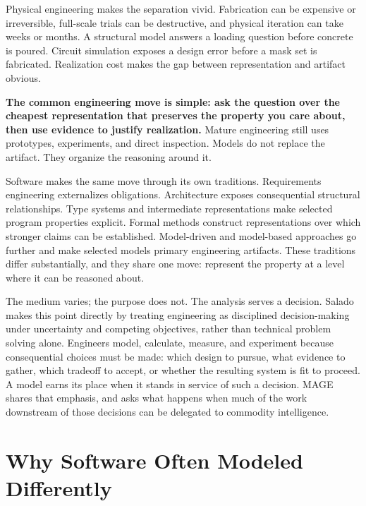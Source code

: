 Physical engineering makes the separation vivid. Fabrication can be expensive or irreversible, full-scale trials can be destructive, and physical iteration can take weeks or months. A structural model answers a loading question before concrete is poured. Circuit simulation exposes a design error before a mask set is fabricated. Realization cost makes the gap between representation and artifact obvious.

\textbf{The common engineering move is simple: ask the question over the cheapest representation that preserves the property you care about, then use evidence to justify realization.} Mature engineering still uses prototypes, experiments, and direct inspection. Models do not replace the artifact. They organize the reasoning around it.


Software makes the same move through its own traditions. Requirements engineering externalizes obligations. Architecture exposes consequential structural relationships. Type systems and intermediate representations make selected program properties explicit. Formal methods construct representations over which stronger claims can be established. Model-driven and model-based approaches go further and make selected models primary engineering artifacts. These traditions differ substantially, and they share one move: represent the property at a level where it can be reasoned about.

The medium varies; the purpose does not. The analysis serves a decision. Salado makes this point directly by treating engineering as disciplined decision-making under uncertainty and competing objectives, rather than technical problem solving alone\citep{salado2026}. Engineers model, calculate, measure, and experiment because consequential choices must be made: which design to pursue, what evidence to gather, which tradeoff to accept, or whether the resulting system is fit to proceed. A model earns its place when it stands in service of such a decision. MAGE shares that emphasis, and asks what happens when much of the work downstream of those decisions can be delegated to commodity intelligence.

\section{Why Software Often Modeled Differently}\label{heading:why-software-often-modeled-differently}


